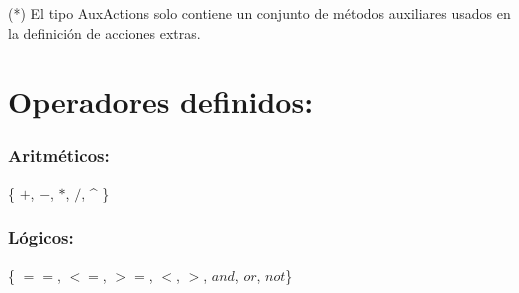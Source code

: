 \documentclass[twoside]{article}
\begin{document}
		\begin{small}
			(*) El tipo AuxActions solo contiene un conjunto de m\'etodos auxiliares usados en la definici\'on de acciones extras.
			
		\end{small}
		
		
		\section{Operadores definidos:}
		
		\subsubsection{Aritm\'eticos:}
		
		\{ $+$, $-$, $*$, $/$, \^{} \}
		\subsubsection{L\'ogicos:}
		\{ $==$, $<=$, $>=$, $<$, $>$, $and$, $or$, $not$\}
		
\end{document}
